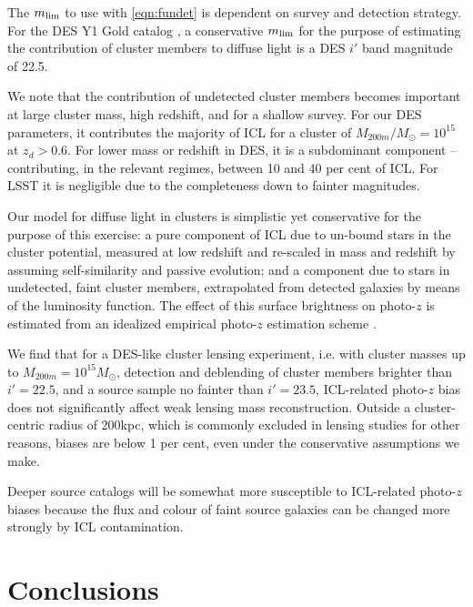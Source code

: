 {The $m_{\rm lim}$ to use with \ref{eqn:fundet} is dependent on survey and detection strategy. For the DES Y1 Gold catalog \citet[][their Figure 8]{2017arXiv170801531D}, a conservative $m_{\rm lim}$ for the purpose of estimating the contribution of cluster members to diffuse light is a DES $i'$ band magnitude of 22.5.

We note that the contribution of undetected cluster members becomes important at large cluster mass, high redshift, and for a shallow survey. For our DES parameters, it contributes the majority of ICL for a cluster of $M_{200m}/M_{\odot}=10^{15}$ at $z_d>0.6$. For lower mass or redshift in DES, it is a subdominant component -- contributing, in the relevant regimes, between 10 and 40 per cent of ICL. For LSST it is negligible due to the completeness down to fainter magnitudes.

Our model for diffuse light in clusters is simplistic yet conservative for the purpose of this exercise: a pure component of ICL due to un-bound stars in the cluster potential, measured at low redshift \citep{icl} and re-scaled in mass and redshift by assuming self-similarity and passive evolution; and a component due to stars in undetected, faint cluster members, extrapolated from detected galaxies by means of the luminosity function. The effect of this surface brightness on photo-$z$ is estimated from an idealized empirical photo-$z$ estimation scheme \citep{2016arXiv161001160G}.

We find that for a DES-like cluster lensing experiment, i.e. with cluster masses up to $M_{200m}=10^{15}M_{\odot}$, detection and deblending of cluster members brighter than $i'=22.5$, and a source sample no fainter than $i'=23.5$, ICL-related photo-$z$ bias does not significantly affect weak lensing mass reconstruction. Outside a cluster-centric radius of $200$kpc, which is commonly excluded in lensing studies for other reasons, biases are below 1 per cent, even under the conservative assumptions we make.

Deeper source catalogs will be somewhat more susceptible to ICL-related photo-$z$ biases because the flux and colour of faint source galaxies can be changed more strongly by ICL contamination. 



\section{Conclusions}\label{sec:conclusion}

}

